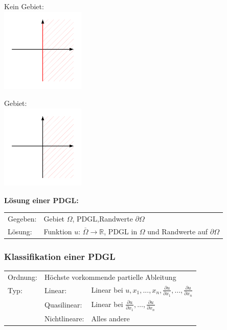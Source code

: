 \begin{minipage}{4cm}
	Kein Gebiet:\\
	\includegraphics[width=4cm]{Content/Theory/gebiet_1.pdf}\\

\end{minipage}
\begin{minipage}{4cm}
  	Gebiet:\\
  	\includegraphics[width=4cm]{Content/Theory/gebiet_2.pdf}\\
\end{minipage}

\textbf{Lösung einer PDGL:}\\
\begin{tabular}{ll}
Gegeben:& Gebiet $\Omega$, PDGL,Randwerte $\partial\Omega$\\
Lösung:& Funktion $u$: $\overset{\_}{\Omega}\rightarrow \mathbb{R}$, PDGL in $\Omega$ und Randwerte auf $\partial\Omega$\\
\end{tabular}

\subsubsection{Klassifikation einer PDGL}
\begin{tabular}{lll}
Ordnung:& \multicolumn{2}{l}{Höchste vorkommende partielle Ableitung}\\
Typ:& Linear: & Linear bei $u, x_1,...,x_n, \frac{\partial u}{\partial x_1},\ldots,\frac{\partial u}{\partial x_n}$\\
& Quasilinear: &  Linear bei $\frac{\partial u}{\partial x_1},\ldots,\frac{\partial u}{\partial x_n}$\\
& Nichtlineare: & Alles andere
\end{tabular}








%



